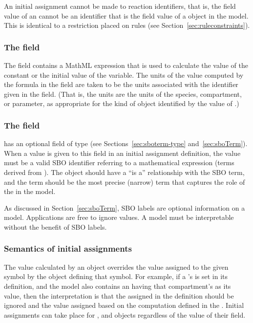 An initial assignment cannot be made to reaction identifiers, that
is, the  field value of an \InitialAssignment cannot
be an identifier that is the  field value of a \Reaction
object in the model.  This is identical to a restriction placed on
rules (see Section~\ref{sec:ruleconstraints}).


\subsubsection{The  field}

The  field contains a MathML expression that is used
to calculate the value of the constant or the initial value of the
variable.  The units of the value computed by the formula in the
 field are taken to be the units associated with the
identifier given in the  field.  (That is, the units
are the units of the species, compartment, or parameter, as
appropriate for the kind of object identified by the value of
.)


\subsubsection{The  field}

\InitialAssignment has an optional  field of type
 (see Sections~\ref{sec:sboterm-type}
and~\ref{sec:sboTerm}).  When a value is given to this field in an
initial assignment definition, the value must be a valid SBO
identifier referring to a mathematical expression (\ie terms
derived from \sbomathformula).  The \InitialAssignment object
should have a ``is a'' relationship with the SBO term, and the
term should be the most precise (narrow) term that captures the
role of the \InitialAssignment in the model.

As discussed in Section~\ref{sec:sboTerm}, SBO labels are optional
information on a model.  Applications are free to ignore
 values.  A model must be interpretable without the
benefit of SBO labels.


\subsubsection{Semantics of initial assignments}
\label{sec:initial-assignment-semantics}

The value calculated by an \InitialAssignment object overrides the
value assigned to the given symbol by the object defining that
symbol.  For example, if a \Compartment's  is set in
its definition, and the model also contains an \InitialAssignment
having that compartment's  as its  value,
then the interpretation is that the  assigned in the
\Compartment definition should be ignored and the value assigned
based on the computation defined in the \InitialAssignment.
Initial assignments can take place for \Compartment, \Species and
\Parameter objects regardless of the value of their
 field.

